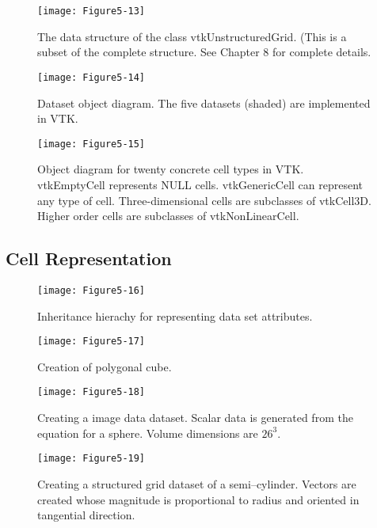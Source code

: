 \begin{figure}[!htb]
	\centering
	\texttt{[image: Figure5-13]}
	\caption{The data structure of the class vtkUnstructuredGrid. (This is a subset of the complete structure. See Chapter 8 for complete details.}
	\label{fig:Figure5-13}
\end{figure}

\begin{figure}[!htb]
	\centering
	\texttt{[image: Figure5-14]}
	\caption{Dataset object diagram. The five datasets (shaded) are implemented in VTK.}
	\label{fig:Figure5-14}
\end{figure}

\begin{figure}[!htb]
	\centering
	\texttt{[image: Figure5-15]}
	\caption{Object diagram for twenty concrete cell types in VTK. vtkEmptyCell represents NULL cells. vtkGenericCell can represent any type of cell. Three-dimensional cells are subclasses of vtkCell3D. Higher order cells are subclasses of vtkNonLinearCell.}
	\label{fig:Figure5-15}
\end{figure}

\subsection{Cell Representation}


\begin{figure}[!htb]
	\centering
	\texttt{[image: Figure5-16]}
	\caption{Inheritance hierachy for representing data set attributes.}
	\label{fig:Figure5-16}
\end{figure}

\begin{figure}[!htb]
	\centering
	\texttt{[image: Figure5-17]}
	\caption{Creation of polygonal cube.}
	\label{fig:Figure5-17}
\end{figure}

\begin{figure}[!htb]
	\centering
	\texttt{[image: Figure5-18]}
	\caption{Creating a image data dataset. Scalar data is generated from the equation for a sphere. Volume dimensions are $26^3$.}
	\label{fig:Figure5-18}
\end{figure}

\begin{figure}[!htb]
	\centering
	\texttt{[image: Figure5-19]}
	\caption{Creating a structured grid dataset of a semi--cylinder. Vectors are created whose magnitude is proportional to radius and oriented in tangential direction.}
	\label{fig:Figure5-19}
\end{figure}

